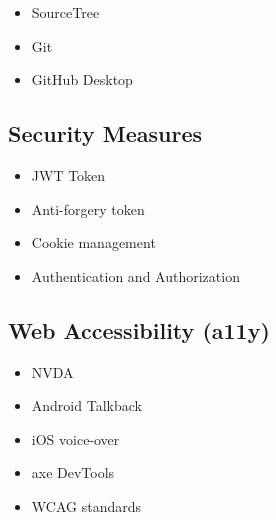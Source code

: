 \documentclass[letterpaper]{deedy-resume} %
\begin{document}
\begin{minipage}[t]{0.33\textwidth}
\begin{itemize}
\setlength\itemsep{-0.5em} %
\item SourceTree
\item Git
\item GitHub Desktop
\end{itemize}


\vspace{-\topsep}


\subsection{Security Measures}

\begin{itemize}
\setlength\itemsep{-0.5em} %
\item JWT Token
\item Anti-forgery token
\item Cookie management
\item Authentication and Authorization
\end{itemize}


\vspace{-\topsep}

\subsection{Web Accessibility (a11y)}

\begin{itemize}
\setlength\itemsep{-0.5em} %
\item NVDA
\item Android Talkback
\item iOS voice-over
\item axe DevTools
\item WCAG standards
\end{itemize}



\end{minipage}
\end{document}
